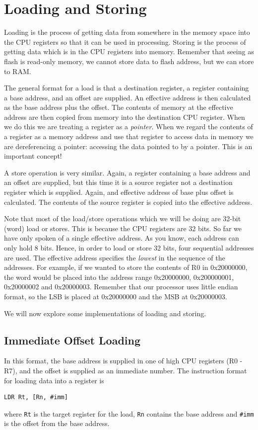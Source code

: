 \chapter{Loading and Storing}
\label{chap:load_store}

Loading is the process of getting data from somewhere in the memory space into the CPU registers so that it can be used in processing. Storing is the process of getting data which is in the CPU registers into memory. Remember that seeing as flash is read-only memory, we cannot store data to flash address, but we can store to RAM.

The general format for a load is that a destination register, a register containing a base address, and an offset are supplied. An effective address is then calculated as the base address plus the offset. The contents of memory at the effective address are then copied from memory into the destination CPU register. When we do this we are treating a register as a \emph{pointer}. When we regard the contents of a register as a memory address and use that register to access data in memory we are dereferencing a pointer: accessing the data pointed to by a pointer. This is an important concept!

A store operation is very similar. Again, a register containing a base address and an offset are supplied, but this time it is a source register not a destination register which is supplied. Again, and effective address of base plus offset is calculated. The contents of the source register is copied into the effective address. 

Note that most of the load/store operations which we will be doing are 32-bit (word) load or stores. This is because the CPU registers are 32 bits. So far we have only spoken of a single effective address. As you know, each address can only hold 8 bits. Hence, in order to load or store 32 bits, four sequential addresses are used. The effective address specifies the \emph{lowest} in the sequence of the addresses. For example, if we wanted to store the contents of R0 in 0x20000000, the word would be placed into the address range 0x20000000, 0x200000001, 0x20000002 and 0x20000003. Remember that our processor uses little endian format, so the LSB is placed at 0x20000000 and the MSB at 0x20000003.

We will now explore some implementations of loading and storing.

\section{Immediate Offset Loading}
In this format, the base address is supplied in one of high CPU registers (R0 - R7), and the offset is supplied as an immediate number. 
The instruction format for loading data into a register is
\begin{lstlisting}[fontadjust=true,frame=trBL]
LDR Rt, [Rn, #imm]
\end{lstlisting}
where \texttt{Rt} is the target register for the load, \texttt{Rn} contains the base address and \texttt{\#imm} is the offset from the base address.


